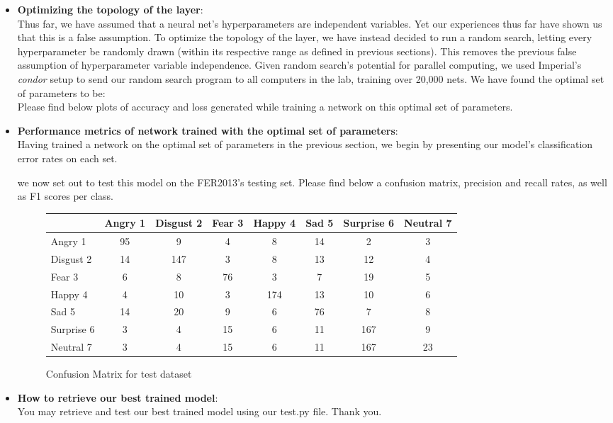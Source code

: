 \begin{itemize}[topsep=-10pt]
\item \textbf{Optimizing the topology of the layer}:\\
  Thus far, we have assumed that a neural net's hyperparameters are independent variables.
  Yet our experiences thus far have shown us that this is a false assumption.
  To optimize the topology of the layer, we have instead decided to run a random search,
  letting every hyperparameter be randomly drawn (within its respective range as defined in previous sections).
  This removes the previous false assumption of hyperparameter variable independence.
  Given random search's potential for parallel computing, we used Imperial's \emph{condor} setup to send our random search program
  to all computers in the lab, training over 20,000 nets.
  We have found the optimal set of parameters to be:\\
  Please find below plots of accuracy and loss generated
  while training a network on this optimal set of parameters.

  
\item \textbf{Performance metrics of network trained with the optimal set of parameters}:\\
  Having trained a network on the optimal set of parameters in the previous section,
  we begin by presenting our model's classification error rates on each set.
  
  we now set out to test this model on the FER2013's testing set.
  Please find below a confusion matrix, precision and recall rates, as well as F1 scores per class.
  \begin{figure}[h]
  \begin{center}
    \caption{Confusion Matrix for test dataset}
    \begin{tabular}{ | l || c | c | c | c | c | c | c |}
    \hline
          & Angry 1 & Disgust 2 & Fear 3 & Happy 4 & Sad 5 & Surprise 6 & Neutral 7 \\ \hline \hline
        Angry 1 & 95 & 9 & 4 & 8 & 14 & 2 & 3 \\ \hline
        Disgust 2 & 14 & 147 & 3 & 8 & 13 & 12 & 4 \\ \hline
        Fear 3 & 6 & 8 & 76 & 3 & 7 & 19 & 5\\ \hline
        Happy 4 & 4 & 10 & 3 & 174 & 13 & 10 & 6 \\ \hline
        Sad 5 & 14 & 20 & 9 & 6 & 76 & 7 & 8\\ \hline
        Surprise 6 & 3 & 4 & 15 & 6 & 11 & 167 & 9 \\ \hline
        Neutral 7 & 3 & 4 & 15 & 6 & 11 & 167  & 23\\ \hline
    \end{tabular}
    \label{fig:confusionMatrix}
\end{center}
\end{figure}



  

  
  
  
  
\item \textbf{How to retrieve our best trained model}:\\
  You may retrieve and test our best trained model using our test.py file.
  Thank you.
\end{itemize}
  

